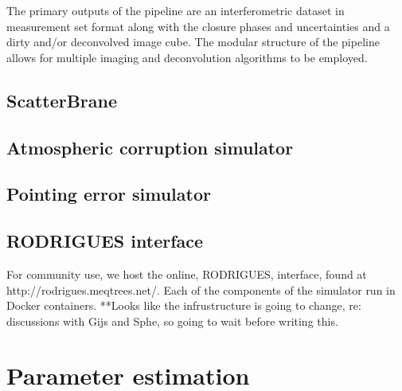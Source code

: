 The primary outputs of the pipeline are an interferometric dataset in {\sc measurement set} format along with the closure phases and uncertainties and a dirty and/or deconvolved image cube. The modular structure of the pipeline allows for multiple imaging and deconvolution algorithms to be employed. 



\subsection{ScatterBrane}




\subsection{Atmospheric corruption simulator}




\subsection{Pointing error simulator}
\subsection{RODRIGUES interface}
For community use, we host the online, RODRIGUES, interface, found at http://rodrigues.meqtrees.net/. Each of the components of the simulator run in Docker containers. **Looks like the infrustructure is going to change, re: discussions with Gijs and Sphe, so going to wait before writing this.

\section{Parameter estimation}
